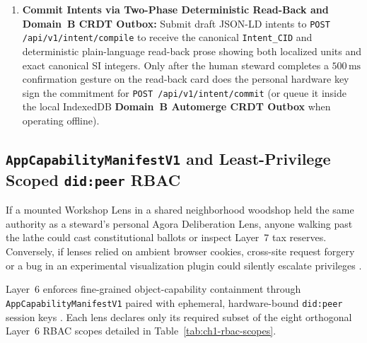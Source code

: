 \begin{enumerate}
    \item \textbf{Commit Intents via Two-Phase Deterministic Read-Back and Domain~B CRDT Outbox:}
          Submit draft JSON-LD intents to \texttt{POST /api/v1/intent/compile} to receive the
          canonical \texttt{Intent\_CID} and deterministic plain-language read-back prose showing
          both localized units and exact canonical SI integers. Only after the human steward
          completes a $500\,\mathrm{ms}$ confirmation gesture on the read-back card does the
          personal hardware key sign the commitment for \texttt{POST /api/v1/intent/commit} (or
          queue it inside the local IndexedDB \textbf{Domain~B Automerge CRDT Outbox} when
          operating offline).
\end{enumerate}

\subsection{\texttt{AppCapabilityManifestV1} and Least-Privilege Scoped \texttt{did:peer} RBAC}

If a mounted Workshop Lens in a shared neighborhood woodshop held the same authority as a
steward's personal Agora Deliberation Lens, anyone walking past the lathe could cast
constitutional ballots or inspect Layer~7 tax reserves. Conversely, if lenses relied on ambient
browser cookies, cross-site request forgery or a bug in an experimental visualization plugin
could silently escalate privileges \parencite{miller2006robust}.

Layer~6 enforces fine-grained object-capability containment through
\texttt{AppCapabilityManifestV1} paired with ephemeral, hardware-bound \texttt{did:peer} session
keys \parencite{w3c2022did,w3c2022vc}. Each lens declares only its required subset of the eight
orthogonal Layer~6 RBAC scopes detailed in Table~\ref{tab:ch1-rbac-scopes}.

